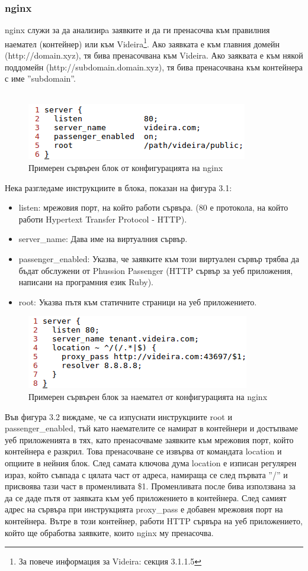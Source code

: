 \documentclass[pdftex,14pt,a4paper]{extreport}
\begin{document}
\subsubsection {nginx}
nginx служи за да анализирa заявките и да ги пренасочва към правилния наемател (контейнер) или към Videira\footnote{За повече информация за Videira: секция 3.1.1.5}. Ако заявката е към главния домейн (http://domain.xyz), тя бива пренасочвана към Videira. Ако заяквата е към някой поддомейн (http://subdomain.domain.xyz), тя бива пренасочвана към контейнера с име ''subdomain''.\\\\
\begin{figure}[H]
  \centering
  \includegraphics[scale=0.8]{./snippets/nginx_main_server}
  \caption{Примерен сървърен блок от конфигурацията на nginx}
\end{figure}
Нека разгледаме инструкциите в блока, показан на фигура 3.1:
\begin{itemize}
  \item listen: мрежовия порт, на който работи сървъра. (80 е протокола, на който работи Hypertext Transfer Protocol - HTTP).
  \item server\_name: Дава име на виртуалния сървър.
  \item passenger\_enabled: Указва, че заявките към този виртуален сървър трябва да бъдат обслужени от Phussion Passenger (HTTP сървър за уеб приложения, написани на програмния език Ruby).
  \item root: Указва пътя към статичните страници на уеб приложението.
\end{itemize}
\begin{figure}[H]
  \centering
  \includegraphics[scale=0.8]{./snippets/nginx_tenant_server}
  \caption{Примерен сървърен блок за наемател от конфигурацията на nginx}
\end{figure}
Във фигура 3.2 виждаме, че са изпуснати инструкциите root и passenger\_enabled, тъй като наемателите се намират в контейнери и достъпваме уеб приложенията в тях, като пренасочваме заявките към мрежовия порт, който контейнера е разкрил. Това пренасочване се извърва от командата location и опциите в нейния блок. След самата ключова дума location е изписан регулярен израз, който съвпада с цялата част от адреса, намираща се след първата ''/'' и присвоява тази част в променливата \$1. Променливата после бива използвана за да се даде пътя от заявката към уеб приложението в контейнера. След самият адрес на сървъра при инструкцията proxy\_pass е добавен мрежовия порт на контейнера. Вътре в този контейнер, работи HTTP сървъра на уеб приложението, който ще обработва заявките, които nginx му пренасочва.
\end{document}
